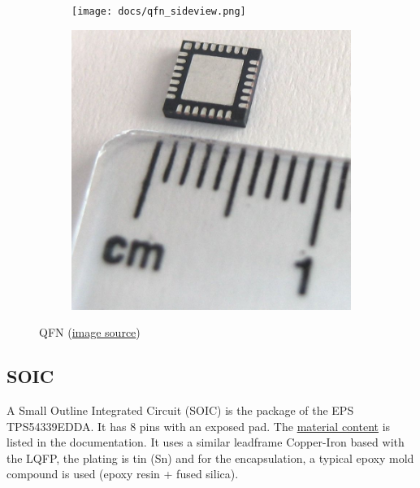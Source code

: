 \documentclass[final]{cubedoc}
\begin{document}
	\begin{figure}[h!]
		\centering
		\begin{subfigure}{.5\textwidth}
			\centering
			\texttt{[image: docs/qfn\_sideview.png]}
			\caption{}
			\label{fig:sub1}
		\end{subfigure}%
		\begin{subfigure}{.5\textwidth}
			\centering
			\includegraphics[keepaspectratio, width=0.5\linewidth, height=.3\textheight]{docs/qfn_real.jpg}
			\caption{}
			\label{fig:sub2}
		\end{subfigure}
		\caption{QFN \small{(\href{https://web.archive.org/web/20200818153946/https://en.wikipedia.org/wiki/Flat_no-leads_package}{image source})}}
		\label{fig:test}
	\end{figure}
	
	
	
	
	
	
	
	
	\subsection{SOIC}
	
	A Small Outline Integrated Circuit (SOIC) is the package of the EPS TPS54339EDDA. It has 8 pins with an exposed pad. The  \href{https://web.archive.org/web/20200818133800/https://www.ti.com/materialcontent/en/report?pcid=263544&opn=TPS54339EDDA}{material content} is listed in the documentation. It uses a similar leadframe Copper-Iron based with the LQFP, the plating is tin (Sn) and for the encapsulation, a typical epoxy mold compound is used (epoxy resin + fused silica). 
	
\end{document}

